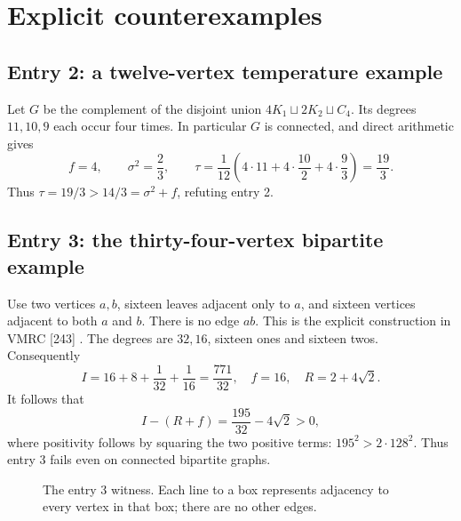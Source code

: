 \documentclass[11pt,a4paper]{article}
\theoremstyle{remark}\newtheorem{remark}[theorem]{Remark}
\begin{document}
\section{Explicit counterexamples}\label{sec:counterexamples}
\subsection{Entry 2: a twelve-vertex temperature example}
Let $G$ be the complement of the disjoint union $4K_1\sqcup2K_2\sqcup C_4$.
Its degrees $11,10,9$ each occur four times. In particular $G$ is connected,
and direct arithmetic gives
\[
 f=4,\qquad \sigma^2=\frac23,\qquad
 \tau=\frac1{12}\left(4\cdot11+4\cdot\frac{10}{2}
                         +4\cdot\frac93\right)=\frac{19}{3}.
\]
Thus $\tau=19/3>14/3=\sigma^2+f$, refuting entry 2.

\subsection{Entry 3: the thirty-four-vertex bipartite example}
Use two vertices $a,b$, sixteen leaves adjacent only to $a$, and sixteen
vertices adjacent to both $a$ and $b$. There is no edge $ab$.
This is the explicit construction in VMRC [243] \cite{vmrc243}.
The degrees are $32,16$, sixteen ones and sixteen twos. Consequently
\[
 I=16+8+\frac1{32}+\frac1{16}=\frac{771}{32},\quad
 f=16,\quad R=2+4\sqrt2.
\]
It follows that
\[
 I-(R+f)=\frac{195}{32}-4\sqrt2>0,
\]
where positivity follows by squaring the two positive terms:
$195^2>2\cdot128^2$. Thus entry 3 fails even on connected bipartite graphs.

\begin{figure}[ht]\centering
{}
\caption{The entry 3 witness. Each line to a box represents adjacency to
every vertex in that box; there are no other edges.}
\end{figure}
\end{document}
